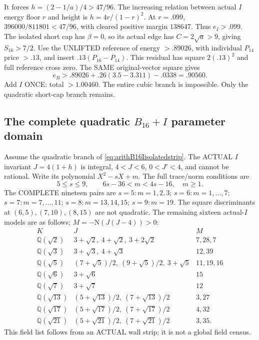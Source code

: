 It forces \(h=(2-1/a)/4>47/96\).
The increasing relation between actual
\(I\) energy floor \(r\) and height is
\(h=4r/(1-r)^2\).
At \(r=.099\),
\(396000/811801<47/96\), with cleared
positive margin \(138647\).
Thus \(e_I>.099\).
The isolated short cap has \(\beta=0\),
so its actual edge has
\(C=2\sqrt a>9\), giving \(S_{16}>7/2\).
Use the UNLIFTED reference of energy
\(>.89026\), with individual
\(P_{14}\) price \(>.13\), and insert
\(.13(P_{16}-P_{14})\).
This residual has square \(2(.13)^2\)
and full reference cross zero.
The SAME original-vector square gives
\[
                    e_B>.89026+.26(3.5-3.311)-.0338=.90560 .
\]
Add \(I\) ONCE: total \(>1.00460\).
The entire cubic branch is impossible.
Only the quadratic short-cap branch remains.

\subsection{The complete quadratic \(B_{16}+I\) parameter domain}
\label{app:arithB16Iquadratic}

Assume the quadratic branch of
\eqref{eq:arithB16Iisolatedstrip}.
The ACTUAL \(I\) invariant \(J=4(1+h)\)
is integral, \(4<J<6\), \(0<J'<4\),
and cannot be rational.
Write its polynomial \(X^2-sX+m\).
The full trace/norm conditions are
\[
              5\le s\le9,\qquad 6s-36<m<4s-16,\quad m\ge1 .
\]
The COMPLETE nineteen pairs are
\(s=5:m=1,2,3\);
\(s=6:m=1,\ldots,7\);
\(s=7:m=7,\ldots,11\);
\(s=8:m=13,14,15\);
\(s=9:m=19\).
The square discriminants at
\((6,5),(7,10),(8,15)\) are not quadratic.
The remaining sixteen actual-\(I\) models
are as follows; \(M=-\mathrm N(J(J-4))>0\):
\[
\begin{array}{c|l|l}
 K&J&M\\ \hline
 \mathbb Q(\sqrt2)&3+\sqrt2,\ 4+\sqrt2,\ 3+2\sqrt2&7,28,7\\
 \mathbb Q(\sqrt3)&3+\sqrt3,\ 4+\sqrt3&12,39\\
 \mathbb Q(\sqrt5)&(7+\sqrt5)/2,\ (9+\sqrt5)/2,\ 3+\sqrt5&11,19,16\\
 \mathbb Q(\sqrt6)&3+\sqrt6&15\\
 \mathbb Q(\sqrt7)&3+\sqrt7&12\\
 \mathbb Q(\sqrt{13})&(5+\sqrt{13})/2,\ (7+\sqrt{13})/2&3,27\\
 \mathbb Q(\sqrt{17})&(5+\sqrt{17})/2,\ (7+\sqrt{17})/2&4,32\\
 \mathbb Q(\sqrt{21})&(5+\sqrt{21})/2,\ (7+\sqrt{21})/2&3,35 .
\end{array}
\]
This field list follows from an ACTUAL
wall strip; it is not a global field census.

